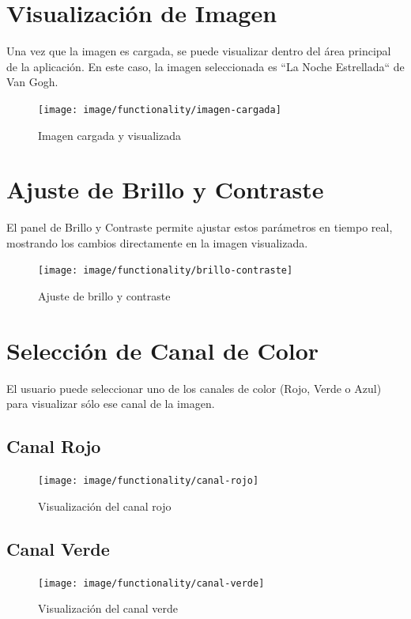 \documentclass{report}
\begin{document}
  \section{Visualización de Imagen}\label{sec:visualizacion-de-imagen}
  Una vez que la imagen es cargada, se puede visualizar dentro del área principal de la aplicación.
  En este caso, la imagen seleccionada es ``La Noche Estrellada`` de Van Gogh.

  \begin{figure}[H]
    \centering
    \texttt{[image: image/functionality/imagen-cargada]}
    \caption{Imagen cargada y visualizada}\label{fig:imagen-cargada}
  \end{figure}


  \section{Ajuste de Brillo y Contraste}\label{sec:ajuste-de-brillo-y-contraste}
  El panel de Brillo y Contraste permite ajustar estos parámetros en tiempo real, mostrando los cambios directamente en la imagen visualizada.

  \begin{figure}[H]
    \centering
    \texttt{[image: image/functionality/brillo-contraste]}
    \caption{Ajuste de brillo y contraste}\label{fig:brillo-contraste}
  \end{figure}


  \section{Selección de Canal de Color}\label{sec:seleccion-de-canal-de-color}
  El usuario puede seleccionar uno de los canales de color (Rojo, Verde o Azul) para visualizar sólo ese canal de la imagen.

  \subsection{Canal Rojo}\label{subsec:canal-rojo}
  \begin{figure}[H]
    \centering
    \texttt{[image: image/functionality/canal-rojo]}
    \caption{Visualización del canal rojo}\label{fig:canal-rojo}
  \end{figure}

  \subsection{Canal Verde}\label{subsec:canal-verde}
  \begin{figure}[H]
    \centering
    \texttt{[image: image/functionality/canal-verde]}
    \caption{Visualización del canal verde}\label{fig:canal-verde}
  \end{figure}
\end{document}
